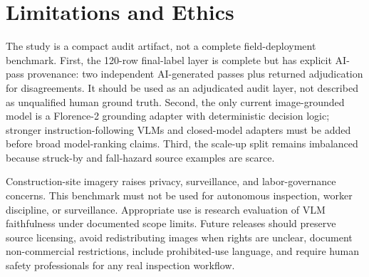 \section{Limitations and Ethics}

The study is a compact audit artifact, not a complete field-deployment benchmark. First, the 120-row final-label layer is complete but has explicit AI-pass provenance: two independent AI-generated passes plus returned adjudication for disagreements. It should be used as an adjudicated audit layer, not described as unqualified human ground truth. Second, the only current image-grounded model is a Florence-2 grounding adapter with deterministic decision logic; stronger instruction-following VLMs and closed-model adapters must be added before broad model-ranking claims. Third, the scale-up split remains imbalanced because struck-by and fall-hazard source examples are scarce.

Construction-site imagery raises privacy, surveillance, and labor-governance concerns. This benchmark must not be used for autonomous inspection, worker discipline, or surveillance. Appropriate use is research evaluation of VLM faithfulness under documented scope limits. Future releases should preserve source licensing, avoid redistributing images when rights are unclear, document non-commercial restrictions, include prohibited-use language, and require human safety professionals for any real inspection workflow.
